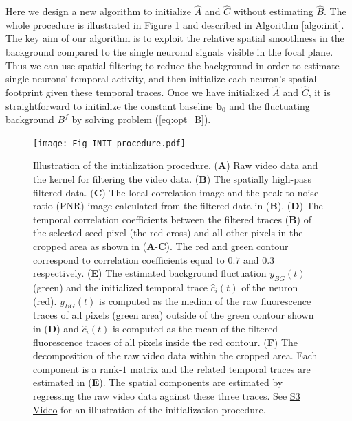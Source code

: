 \documentclass[9pt,lineno]{elife}
\begin{document}
Here we design a new algorithm to initialize $\hat{A}$ and $\hat{C}$ without estimating $\hat{B}$. The whole procedure is illustrated in Figure \ref{fig:initialization} and described in Algorithm \ref{algo:init}. The key aim of our algorithm is to exploit the relative spatial smoothness in the background compared to the single neuronal signals visible in the focal plane. Thus we can use spatial filtering  to  reduce the background in order to estimate single neurons' temporal activity, and then initialize each neuron's spatial footprint given these temporal traces. Once we have initialized $\hat{A}$ and $\hat{C}$, it is straightforward to initialize the constant baseline $\bm{b}_0$ and the fluctuating background $B^f$ by solving problem (\ref{eq:opt_B}). 

\begin{figure}[!t]
  \texttt{[image: Fig\_INIT\_procedure.pdf]}
  \caption{Illustration of the initialization procedure. (\textbf{A}) Raw video data and the kernel for filtering the video data. (\textbf{B}) The spatially high-pass filtered data. (\textbf{C}) The local correlation image and the peak-to-noise ratio (PNR) image calculated from the filtered data in (\textbf{B}). (\textbf{D}) The temporal correlation coefficients between the filtered traces (\textbf{B}) of the selected seed pixel (the red cross) and all other pixels in the cropped area as shown in (\textbf{A}-\textbf{C}). The red and green contour correspond to correlation coefficients equal to $0.7$ and $0.3$ respectively. (\textbf{E}) The estimated background fluctuation $y_{BG}(t)$ (green) and the initialized temporal trace $\hat{c}_i(t)$ of the neuron (red). $y_{BG}(t)$ is computed as the median of the raw fluorescence traces of all pixels (green area) outside of the green contour shown in (\textbf{D}) and $\hat{c}_i(t)$ is computed as the mean of the filtered fluorescence traces of all pixels inside the red contour. (\textbf{F}) The decomposition of the raw video data within the cropped area. Each component is a rank-$1$ matrix and the related temporal traces are estimated in (\textbf{E}). The spatial components are estimated by regressing the raw video data against these three traces. See  \href{http://www.columbia.edu/~pz2230/videos/sim_initialization.mp4}{S3 Video} for an illustration of the initialization procedure.}
  \label{fig:initialization}
\end{figure}
\end{document}
